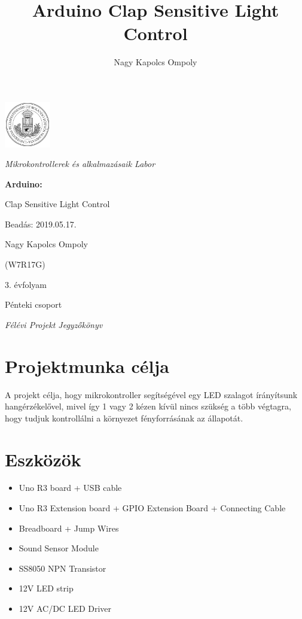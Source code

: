 \documentclass[a4paper,11pt]{article}
\author{Nagy Kapolcs Ompoly}
\title{Arduino Clap Sensitive Light Control}
\date{ }
\begin{document}
\begin{titlepage}
	\centering
	\includegraphics[width=0.15\textwidth]{eltecimer.jpg}\par
	\vspace{1cm}
	{\Large\itshape Mikrokontrollerek és alkalmazásaik Labor\par}
	{\huge\bfseries Arduino: \par Clap Sensitive Light Control\par}
	
	\vfill
	
	\raggedleft
	Beadás: 2019.05.17.\par
	\vspace{0.5cm}
	Nagy Kapolcs Ompoly\par
	(W7R17G)\par
	3. évfolyam\par
	Pénteki csoport\par
	
	\vspace{0.5cm}

	\centering
	{\small\itshape Félévi Projekt Jegyzőkönyv \par}
\end{titlepage}
\clearpage
\setcounter{page}{1}
\newpage
\renewcommand{\thesection}{\Roman{section}}
\renewcommand{\thesubsection}{\thesection.\arabic{subsection}}
\renewcommand{\thesubsubsection}{\thesubsection.\arabic{subsubsection}}
\section{Projektmunka célja}
A projekt célja, hogy mikrokontroller segítségével egy LED szalagot írányítsunk hangérzékelővel, mivel így 1 vagy 2 kézen kívül nincs szükség a több végtagra, hogy tudjuk kontrollálni a környezet fényforrásának az állapotát.

\section{Eszközök}

\begin{itemize}
	\item Uno R3 board + USB cable
	\item Uno R3 Extension board + GPIO Extension Board + Connecting Cable
	\item Breadboard + Jump Wires
	\item Sound Sensor Module 
	\item SS8050 NPN Transistor
	\item 12V LED strip
	\item 12V AC/DC LED Driver
\end{itemize}
\end{document}
